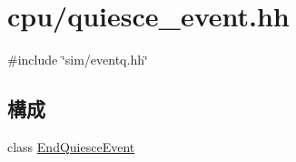 \hypertarget{quiesce__event_8hh}{
\section{cpu/quiesce\_\-event.hh}
\label{quiesce__event_8hh}
}
{\ttfamily \#include \char`\"{}sim/eventq.hh\char`\"{}}\par
\subsection*{構成}
\begin{DoxyCompactItemize}
\item 
class \hyperlink{classEndQuiesceEvent}{EndQuiesceEvent}
\end{DoxyCompactItemize}
